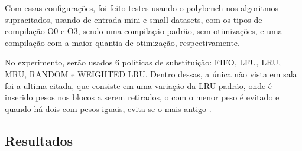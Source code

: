 \documentclass[12pt]{article}
\begin{document}
    Com essas configurações, foi feito testes usando o polybench nos algoritmos 
    supracitados, usando de entrada mini e small datasets, com os tipos de 
    compilação O0 e O3, sendo uma compilação padrão, sem otimizações, e uma 
    compilação com a maior quantia de otimização, respectivamente.

    No experimento, serão usados 6 políticas de substituição: FIFO, LFU, LRU, 
    MRU, RANDOM e WEIGHTED LRU. Dentro dessas, a única não vista em sala foi a 
    ultima citada, que consiste em uma variação da LRU padrão, onde é inserido 
    pesos nos blocos a serem retirados, o com o menor peso é evitado e quando 
    há dois com pesos iguais, evita-se o mais antigo \cite{article}.

    \subsection{Resultados}
    
\end{document}
